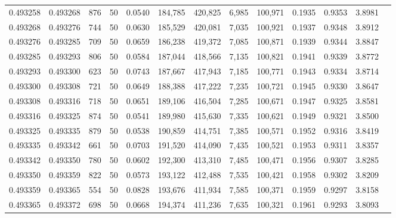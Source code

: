 \begin{tabular}{rrrrrrrrrrrrr}
0.493258 & 0.493268 &   876 &  50 &                                     0.0540 & 184,785 & 420,825 &   6,985 & 100,971 & 0.1935 & 0.9353 & 3.8981 \\
0.493268 & 0.493276 &   744 &  50 &                                     0.0630 & 185,529 & 420,081 &   7,035 & 100,921 & 0.1937 & 0.9348 & 3.8912 \\
0.493276 & 0.493285 &   709 &  50 &                                     0.0659 & 186,238 & 419,372 &   7,085 & 100,871 & 0.1939 & 0.9344 & 3.8847 \\
0.493285 & 0.493293 &   806 &  50 &                                     0.0584 & 187,044 & 418,566 &   7,135 & 100,821 & 0.1941 & 0.9339 & 3.8772 \\
0.493293 & 0.493300 &   623 &  50 &                                     0.0743 & 187,667 & 417,943 &   7,185 & 100,771 & 0.1943 & 0.9334 & 3.8714 \\
0.493300 & 0.493308 &   721 &  50 &                                     0.0649 & 188,388 & 417,222 &   7,235 & 100,721 & 0.1945 & 0.9330 & 3.8647 \\
0.493308 & 0.493316 &   718 &  50 &                                     0.0651 & 189,106 & 416,504 &   7,285 & 100,671 & 0.1947 & 0.9325 & 3.8581 \\
0.493316 & 0.493325 &   874 &  50 &                                     0.0541 & 189,980 & 415,630 &   7,335 & 100,621 & 0.1949 & 0.9321 & 3.8500 \\
0.493325 & 0.493335 &   879 &  50 &                                     0.0538 & 190,859 & 414,751 &   7,385 & 100,571 & 0.1952 & 0.9316 & 3.8419 \\
0.493335 & 0.493342 &   661 &  50 &                                     0.0703 & 191,520 & 414,090 &   7,435 & 100,521 & 0.1953 & 0.9311 & 3.8357 \\
0.493342 & 0.493350 &   780 &  50 &                                     0.0602 & 192,300 & 413,310 &   7,485 & 100,471 & 0.1956 & 0.9307 & 3.8285 \\
0.493350 & 0.493359 &   822 &  50 &                                     0.0573 & 193,122 & 412,488 &   7,535 & 100,421 & 0.1958 & 0.9302 & 3.8209 \\
0.493359 & 0.493365 &   554 &  50 &                                     0.0828 & 193,676 & 411,934 &   7,585 & 100,371 & 0.1959 & 0.9297 & 3.8158 \\
0.493365 & 0.493372 &   698 &  50 &                                     0.0668 & 194,374 & 411,236 &   7,635 & 100,321 & 0.1961 & 0.9293 & 3.8093 \\

\end{tabular}
